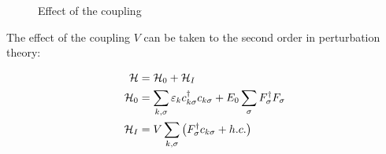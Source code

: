 \begin{figure}[h]
	\centering
	
	\caption{Effect of the coupling}
	\label{fig:band_anderson}
\end{figure}

The effect of the coupling \(V\) can be taken to the second order in perturbation theory:

\begin{align}
\begin{split}
\mathcal{H} &= \mathcal{H}_0  + \mathcal{H}_I \\
\mathcal{H}_0 &= \sum_{k,\sigma}\varepsilon_k c_{k\sigma}^\dagger c_{k\sigma} + E_0\sum_\sigma F_\sigma^\dagger F_\sigma \\
\mathcal{H}_I  &= V\sum_{k,\sigma}\left(F_\sigma^\dagger c_{k\sigma} +  h.c.\right)
\end{split}
\end{align}

